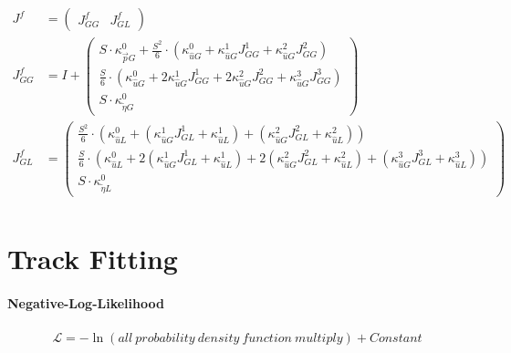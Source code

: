 \documentclass[review]{elsarticle}
\begin{document}
\begin{equation}
\begin{alignedat}{-1}
    J^{f}&=\left(\begin{array}{cc}
        J_{GG}^{f} & J_{GL}^{f}
    \end{array}\right) \\
    J_{GG}^{f}&=I+\left(\begin{array}{l}
        S\cdot\kappa_{\vec{p}G}^{0}+\frac{S^{2}}{6}\cdot\left(\kappa_{\hat{u}G}^{0}+\kappa_{\hat{u}G}^{1}J_{GG}^{1}+\kappa_{\hat{u}G}^{2}J_{GG}^{2}\right)\\
        \frac{S}{6}\cdot\left(\kappa_{\hat{u}G}^{0}+2\kappa_{\hat{u}G}^{1}J_{GG}^{1}+2\kappa_{\hat{u}G}^{2}J_{GG}^{2}+\kappa_{\hat{u}G}^{3}J_{GG}^{3}\right)\\
        S\cdot\kappa_{\tilde{\eta}G}^{0}
    \end{array}\right) \\
    J_{GL}^{f}&=\left(\begin{array}{l}
        \frac{S^{2}}{6}\cdot\left(\kappa_{\hat{u}L}^{0}+\left(\kappa_{\hat{u}G}^{1}J_{GL}^{1}+\kappa_{\hat{u}L}^{1}\right)+\left(\kappa_{\hat{u}G}^{2}J_{GL}^{2}+\kappa_{\hat{u}L}^{2}\right)\right)\\
        \frac{S}{6}\cdot\left(\kappa_{\hat{u}L}^{0}+2\left(\kappa_{\hat{u}G}^{1}J_{GL}^{1}+\kappa_{\hat{u}L}^{1}\right)+2\left(\kappa_{\hat{u}G}^{2}J_{GL}^{2}+\kappa_{\hat{u}L}^{2}\right)+\left(\kappa_{\hat{u}G}^{3}J_{GL}^{3}+\kappa_{\hat{u}L}^{3}\right)\right)\\
        S\cdot\kappa_{\tilde{\eta}L}^{0}
    \end{array}\right) \\
\end{alignedat} \end{equation} 



\section{Track Fitting}

\paragraph{Negative-Log-Likelihood}
\begin{equation} \begin{alignedat}{-1}
    \mathcal{L}=-\ln{\left(all\ probability\ density\ function\ multiply\right)}+Constant
\end{alignedat} \end{equation} 
\end{document}
